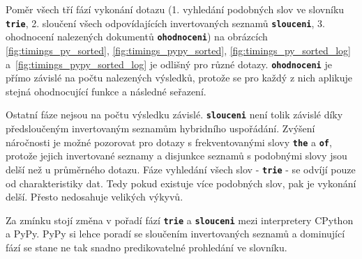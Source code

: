 \documentclass[11pt,letterpaper,oneside,openright]{book}
\newcommand{\bftt}[1]{\texttt{\textbf{#1}}}
\begin{document}
Poměr všech tří fází vykonání dotazu (1. vyhledání podobných slov ve slovníku
\bftt{trie}, 2. sloučení všech odpovídajících invertovaných seznamů
\bftt{slouceni}, 3. ohodnocení nalezených dokumentů \bftt{ohodnoceni}) na
obrázcích \ref{fig:timings_py_sorted}, \ref{fig:timings_pypy_sorted},
\ref{fig:timings_py_sorted_log} a~\ref{fig:timings_pypy_sorted_log} je odlišný
pro různé dotazy. \bftt{ohodnoceni} je přímo závislé na počtu nalezených
výsledků, protože se pro každý z nich aplikuje stejná ohodnocující funkce a
následné seřazení.

Ostatní fáze nejsou na počtu výsledku závislé. \bftt{slouceni} není tolik
závislé díky předsloučeným invertovaným seznamům hybridního uspořádání. Zvýšení
náročnosti je možné pozorovat pro dotazy s frekventovanými slovy \bftt{the} a
\bftt{of}, protože jejich invertované seznamy a disjunkce seznamů s podobnými
slovy jsou delší než u průměrného dotazu. Fáze vyhledání všech slov -
\bftt{trie} - se odvíjí pouze od charakteristiky dat. Tedy pokud existuje více
podobných slov, pak je vykonání delší. Přesto nedosahuje velikých výkyvů.

Za zmínku stojí změna v pořadí fází \bftt{trie} a \bftt{slouceni} mezi
interpretery CPython a PyPy. PyPy si lehce poradí se sloučením invertovaných
seznamů a dominující fází se stane ne tak snadno predikovatelné prohledání ve
slovníku.
\end{document}
